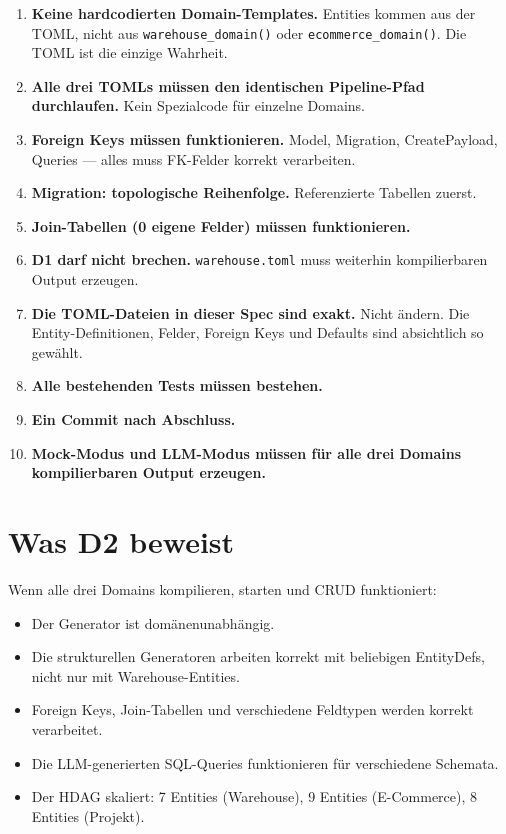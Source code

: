 \documentclass[11pt,a4paper]{article}
\begin{document}
\begin{enumerate}
\item \textbf{Keine hardcodierten Domain-Templates.} Entities kommen
      aus der TOML, nicht aus \texttt{warehouse\_domain()} oder
      \texttt{ecommerce\_domain()}. Die TOML ist die einzige Wahrheit.
\item \textbf{Alle drei TOMLs m\"ussen den identischen Pipeline-Pfad
      durchlaufen.} Kein Spezialcode f\"ur einzelne Domains.
\item \textbf{Foreign Keys m\"ussen funktionieren.} Model, Migration,
      CreatePayload, Queries --- alles muss FK-Felder korrekt
      verarbeiten.
\item \textbf{Migration: topologische Reihenfolge.} Referenzierte
      Tabellen zuerst.
\item \textbf{Join-Tabellen (0 eigene Felder) m\"ussen funktionieren.}
\item \textbf{D1 darf nicht brechen.} \texttt{warehouse.toml} muss
      weiterhin kompilierbaren Output erzeugen.
\item \textbf{Die TOML-Dateien in dieser Spec sind exakt.} Nicht
      \"andern. Die Entity-Definitionen, Felder, Foreign Keys und
      Defaults sind absichtlich so gew\"ahlt.
\item \textbf{Alle bestehenden Tests m\"ussen bestehen.}
\item \textbf{Ein Commit nach Abschluss.}
\item \textbf{Mock-Modus und LLM-Modus m\"ussen f\"ur alle drei
      Domains kompilierbaren Output erzeugen.}
\end{enumerate}

\section{Was D2 beweist}

Wenn alle drei Domains kompilieren, starten und CRUD funktioniert:

\begin{itemize}[nosep]
\item Der Generator ist dom\"anenunabh\"angig.
\item Die strukturellen Generatoren arbeiten korrekt mit beliebigen
      EntityDefs, nicht nur mit Warehouse-Entities.
\item Foreign Keys, Join-Tabellen und verschiedene Feldtypen
      werden korrekt verarbeitet.
\item Die LLM-generierten SQL-Queries funktionieren f\"ur
      verschiedene Schemata.
\item Der HDAG skaliert: 7 Entities (Warehouse), 9 Entities
      (E-Commerce), 8 Entities (Projekt).
\end{itemize}
\end{document}
